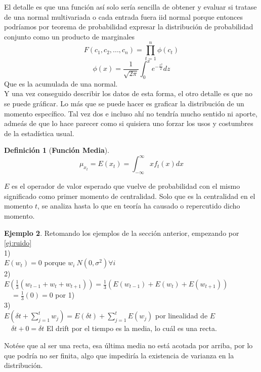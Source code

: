 \documentclass[11pt,a4paper,oneside]{report}
\theoremstyle{definition}
\newtheorem{definicion}{Definición}[chapter]
\newtheorem{ejemplo}[definicion]{Ejemplo}
\theoremstyle{plain}
\theoremstyle{remark}
\newcommand{\termino}[1]{\textbf{#1}\index{#1}}
\begin{document}
El detalle es que una función así solo sería sencilla de obtener y evaluar si tratase de una
normal multivariada o cada entrada fuera iid normal porque entonces podríamos por teorema de 
probabilidad expresar la distribución de probabilidad conjunto como un producto de marginales
\[F(c_1,c_2,...,c_n)=\prod_{t=1}^{n}\phi(c_t)\] 
\[\phi(x)=\frac{1}{\sqrt{2\pi}}\int_{0}^{x}e^{-\frac{z^2}{2}} dz \]
Que es la acumulada de una normal.\\
Y una vez conseguido describir los datos de esta forma, el otro detalle es que no se puede gráficar.
Lo más que se puede hacer es graficar la distribución de un momento específico. Tal vez dos e incluso
ahí no tendría mucho sentido ni aporte, admeás de que lo hace parecer como si quisiera uno forzar
los usos y costumbres de la estadística usual.

\begin{definicion}[\termino{Función Media}]
  \[ \mu_{x_t}=E(x_t)=\int_{-\infty}^{\infty}xf_t(x)dx\]
\end{definicion}
$E$ es el operador de valor esperado que vuelve de probabilidad con el mismo significado como
primer momento de centralidad. Solo que es la centralidad en el momento $t$, se analiza hasta 
lo que en teoría ha causado o repercutido dicho momento.

\begin{ejemplo}\label{ej:media RW}
  Retomando los ejemplos de la sección anterior, empezando por \cref{ej:ruido}\\
  1)\\
  $E(w_t)=0$ porque $w_i~N(0,\sigma^2) \forall i$\\
  2)\\
  $E(\frac{1}{3}(w_{t-1}+w_{t}+w_{t+1}))=\frac{1}{3}(E(w_{t-1})+E(w_t)+E(w_{t+1}))$\\
  $\quad = \frac{1}{3}(0)=0$ por 1)\\
  3)\\
  $E(\delta t + \sum_{j = 1}^{t}w_j)=E(\delta t)+\sum_{j = 1}^{t}E(w_j)$ por linealidad de $E$\\
  $\quad \delta t +0 =\delta t$ El drift por el tiempo es la media, lo cuál es una recta.
\end{ejemplo}
Notése que al ser una recta, esa última media no está acotada por arriba, por lo que podría
no ser finita, algo que impediría la existencia de varianza en la distribución. 
\end{document}
